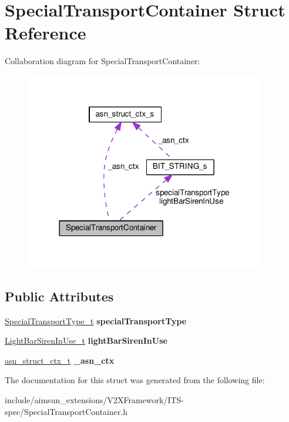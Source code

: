 \hypertarget{structSpecialTransportContainer}{}\section{Special\+Transport\+Container Struct Reference}
\label{structSpecialTransportContainer}


Collaboration diagram for Special\+Transport\+Container\+:\nopagebreak
\begin{figure}[H]
\begin{center}
\leavevmode
\includegraphics[width=297pt]{structSpecialTransportContainer__coll__graph}
\end{center}
\end{figure}
\subsection*{Public Attributes}
\begin{DoxyCompactItemize}
\item 
\hyperlink{structBIT__STRING__s}{Special\+Transport\+Type\+\_\+t} {\bfseries special\+Transport\+Type}\hypertarget{structSpecialTransportContainer_a0fc9d11d30b057428c008e58ef568717}{}\label{structSpecialTransportContainer_a0fc9d11d30b057428c008e58ef568717}

\item 
\hyperlink{structBIT__STRING__s}{Light\+Bar\+Siren\+In\+Use\+\_\+t} {\bfseries light\+Bar\+Siren\+In\+Use}\hypertarget{structSpecialTransportContainer_ac3321fee98bc433698b0c4fb9a8f7802}{}\label{structSpecialTransportContainer_ac3321fee98bc433698b0c4fb9a8f7802}

\item 
\hyperlink{structasn__struct__ctx__s}{asn\+\_\+struct\+\_\+ctx\+\_\+t} {\bfseries \+\_\+asn\+\_\+ctx}\hypertarget{structSpecialTransportContainer_a53c218e45666bcc28471827f6c2e71c9}{}\label{structSpecialTransportContainer_a53c218e45666bcc28471827f6c2e71c9}

\end{DoxyCompactItemize}


The documentation for this struct was generated from the following file\+:\begin{DoxyCompactItemize}
\item 
include/aimsun\+\_\+extensions/\+V2\+X\+Framework/\+I\+T\+S-\/spec/Special\+Transport\+Container.\+h\end{DoxyCompactItemize}
